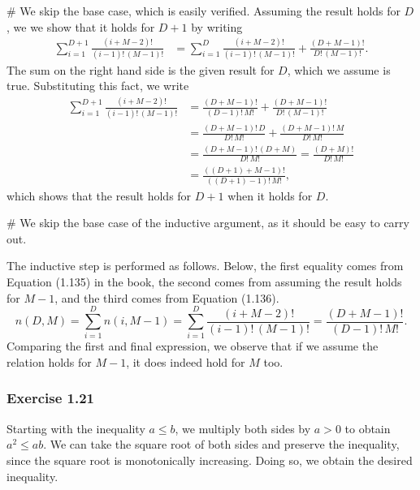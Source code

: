 \documentclass[12pt, a4paper]{article}
\begin{document}
\begin{easylist}[enumerate]
	# We skip the base case, which is easily verified.
	Assuming the result holds for $D$, we we show that it holds for $D+1$ by writing
	\begin{align*}
		\sum_{i=1}^{D + 1} \frac{(i +M - 2)!}{(i-1)!\, (M-1)!} &=
		\sum_{i=1}^{D} \frac{(i +M - 2)!}{(i-1)! \, (M-1)!}
		+  \frac{(D+M-1)!}{D! \, (M-1)!}.
	\end{align*}
	The sum on the right hand side is the given result for $D$, which we assume is true.
	Substituting this fact, we write
	\begin{align*}
		\sum_{i=1}^{D + 1} \frac{(i +M - 2)!}{(i-1)! \, (M-1)!} &=
		\frac{(D + M - 1)!}{(D- 1)! \, M!}
		+  \frac{(D+M-1)!}{D! \, (M-1)!} \\
		&=
		\frac{(D + M - 1)! \, D}{D! \, M!}
		+  \frac{(D+M-1)! \, M}{D! \, M!} \\
		&=
		\frac{(D + M - 1)! \, (D + M)}{D! \, M!} = \frac{(D + M)!}{D!\, M!} \\
		&=\frac{((D+1) + M - 1)!}{((D+1) - 1)! \, M!},
	\end{align*}
	which shows that the result holds for $D+1$ when it holds for $D$.
	
	# We skip the base case of the inductive argument, as it should be easy to carry out.
	
	The inductive step is performed as follows.
	Below, the first equality comes from Equation (1.135) in the book,
	the second comes from assuming the result holds for $M-1$,
	and the third comes from Equation (1.136).
	\begin{equation*}
		n(D, M) = \sum_{i=1}^{D} n(i, M - 1)
		= \sum_{i=1}^{D} \frac{(i +M - 2)!}{(i-1)!\, (M-1)!} 
		= 
		 \frac{(D + M - 1)!}{(D - 1)! \, M !}.
	\end{equation*}
	Comparing the first and final expression, we observe that if we assume the relation holds for $M-1$, it does indeed hold for $M$ too.
\end{easylist}


\subsubsection*{Exercise 1.21}
Starting with the inequality $a \leq b$, we multiply both sides by $a > 0$ to obtain $a^2 \leq ab$.
We can take the square root of both sides and preserve the inequality, since the square root is monotonically increasing.
Doing so, we obtain the desired inequality.
\end{document}
